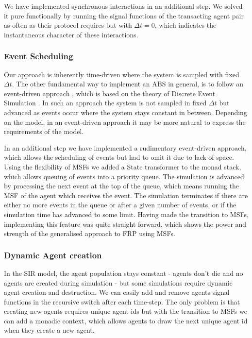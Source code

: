 We have implemented synchronous interactions in an additional step. We solved it pure functionally by running the signal functions of the transacting agent pair as often as their protocol requires but with $\Delta t=0$, which indicates the instantaneous character of these interactions.

\subsubsection{Event Scheduling}
Our approach is inherently time-driven where the system is sampled with fixed $\Delta t$. The other fundamental way to implement an ABS in general, is to follow an event-driven approach \cite{meyer_event-driven_2014}, which is based on the theory of Discrete Event Simulation \cite{zeigler_theory_2000}. In such an approach the system is not sampled in fixed $\Delta t$ but advanced as events occur where the system stays constant in between. Depending on the model, in an event-driven approach it may be more natural to express the requirements of the model.

In an additional step we have implemented a rudimentary event-driven approach, which allows the scheduling of events but had to omit it due to lack of space. Using the flexibility of MSFs we added a State transformer to the monad stack, which allows queuing of events into a priority queue. The simulation is advanced by processing the next event at the top of the queue, which means running the MSF of the agent which receives the event. The simulation terminates if there are either no more events in the queue or after a given number of events, or if the simulation time has advanced to some limit. Having made the transition to MSFs, implementing this feature was quite straight forward, which shows the power and strength of the generalised approach to FRP using MSFs.

\subsubsection{Dynamic Agent creation}
In the SIR model, the agent population stays constant - agents don't die and no agents are created during simulation - but some simulations \cite{epstein_growing_1996} require dynamic agent creation and destruction. We can easily add and remove agents signal functions in the recursive switch after each time-step. The only problem is that creating new agents requires unique agent ids but with the transition to MSFs we can add a monadic context, which allows agents to draw the next unique agent id when they create a new agent. 

